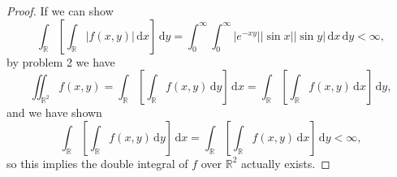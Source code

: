 \begin{proof}
    If we can show 
    \[
        \int _{\mathbb{R} } \left[ \int _{\mathbb{R} } \vert f(x, y) \vert  \, \mathrm{d} x  \right] \, \mathrm{d} y = \int _0^{\infty} \int _0^{\infty} \vert e^{-xy} \vert \vert \sin x \vert \vert \sin y \vert \, \mathrm{d} x \, \mathrm{d} y < \infty ,  
    \]
    by problem 2 we have 
    \[
        \iint_{\mathbb{R} ^2} f(x, y) = \int _{\mathbb{R} } \left[ \int _{\mathbb{R} } f(x, y) \, \mathrm{d} y  \right] \, \mathrm{d} x = \int _{\mathbb{R} } \left[ \int _{\mathbb{R} } f(x, y) \, \mathrm{d} x  \right] \, \mathrm{d} y,
    \]
    and we have shown 
    \[
        \int _{\mathbb{R} } \left[ \int _{\mathbb{R} } f(x, y) \, \mathrm{d} y  \right] \, \mathrm{d} x = \int _{\mathbb{R} } \left[ \int _{\mathbb{R} } f(x, y) \, \mathrm{d} x  \right] \, \mathrm{d} y < \infty,
    \]
    so this implies the double integral of \(f\) over \(\mathbb{R} ^2\) actually exists.
    

\end{proof}
